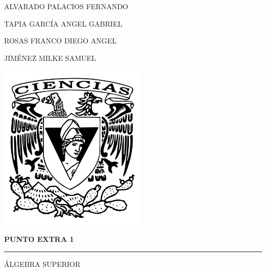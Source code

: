 
\thispagestyle{empty}
\begin{center}
	\large{\uppercase{Alvarado Palacios Fernando}} 

	\large{\uppercase{Tapia García Angel Gabriel}}
	
    \large{\uppercase{Rosas Franco Diego Angel}}   
    
    \large{\uppercase{Jiménez Milke Samuel}}

    \vspace{2 cm}
    \includegraphics[height=8cm]{img/logo-ciencias.png}
    \vspace{4 cm}
    
    {\Huge \textbf{PUNTO EXTRA 1}}
    \vspace{1 cm}
    \hrule
    \vspace{0.5 cm}
    {\huge {\uppercase{Álgebra Superior}}}
\end{center}